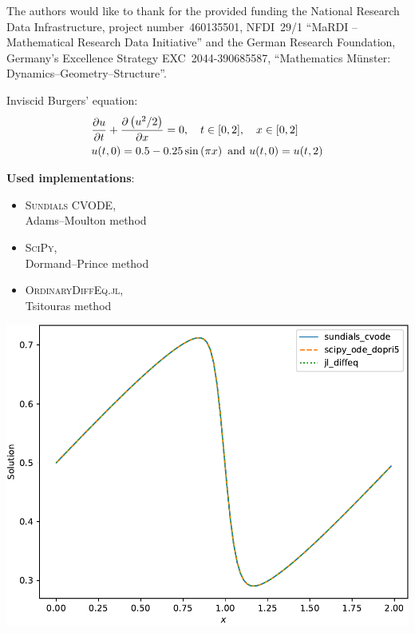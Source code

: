 \documentclass[a0paper, twocolumn, csc, english, final]{mpi2015_poster}
\begin{document}
\begin{poster}
\begin{pcolumn}
    \begin{pbox}
      \large
      The authors would like to thank for the provided funding
      the National Research Data Infrastructure,
      project number~460135501, NFDI~29/1 “MaRDI – Mathematical
      Research Data Initiative”
      and
      the German Research Foundation,
      Germany's Excellence Strategy EXC~2044-390685587,
      ``Mathematics Münster: Dynamics--Geometry--Structure''.
    \end{pbox}
  \end{pcolumn}
  \begin{pcolumn}
    \begin{pbox}
      \large
      Inviscid Burgers' equation:
      \begin{align*}
         & \pdv{u}{t} + \pdv{\left( u^{2} / 2 \right)}{x} = 0,
        \quad t \in [0, 2], \quad x \in [0, 2]                 \\
         & u(t, 0) = 0.5 - 0.25 \sin \left( \pi x \right) \mbox{ and }
         u(t, 0) = u(t, 2)
      \end{align*}
      \begin{minipage}{\dimexpr0.58\columnwidth - 2\tabcolsep}
        \vspace{-2em}
        \textbf{Used implementations}:
        \begin{itemize}
          \item \textsc{Sundials CVODE},\\Adams--Moulton method
          \item \textsc{SciPy},\\Dormand--Prince method
          \item \textsc{OrdinaryDiffEq.jl},\\Tsitouras method
        \end{itemize}
      \end{minipage}\hfill%
      \begin{minipage}{\dimexpr0.42\columnwidth - 2\tabcolsep}
        \vspace{-1em}
        \includegraphics[width=\linewidth]{ivp_c_burgers_eq}
      \end{minipage}


\end{pbox}
\end{pcolumn}
\end{poster}
\end{document}
